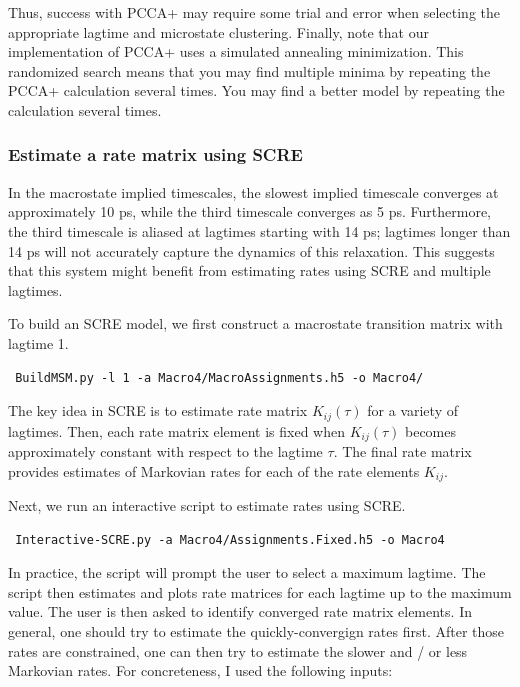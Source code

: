 \documentclass[12pt]{article}
\begin{document}
Thus, success with PCCA+ may require some trial and error when selecting the appropriate lagtime and microstate clustering.  Finally, note that our implementation of PCCA+ uses a simulated annealing minimization.  This randomized search means that you may find multiple minima by repeating the PCCA+ calculation several times.  You may find a better model by repeating the calculation several times.  

\subsubsection{Estimate a rate matrix using SCRE}

In the macrostate implied timescales, the slowest implied timescale converges at approximately 10 ps, while the third timescale converges as 5 ps.  Furthermore, the third timescale is aliased at lagtimes starting with 14 ps; lagtimes longer than 14 ps will not accurately capture the dynamics of this relaxation.  This suggests that this system might benefit from estimating rates using SCRE and multiple lagtimes.  

To build an SCRE model, we first construct a macrostate transition matrix with lagtime 1.  

\begin{verbatim}
 BuildMSM.py -l 1 -a Macro4/MacroAssignments.h5 -o Macro4/
\end{verbatim}

The key idea in SCRE is to estimate rate matrix $K_{ij}(\tau)$ for a variety of lagtimes.  Then, each rate matrix element is fixed when $K_{ij}(\tau)$ becomes approximately constant with respect to the lagtime $\tau$.  The final rate matrix provides estimates of Markovian rates for each of the rate elements $K_{ij}$.  

Next, we run an interactive script to estimate rates using SCRE.  

\begin{verbatim}
 Interactive-SCRE.py -a Macro4/Assignments.Fixed.h5 -o Macro4
\end{verbatim}

In practice, the script will prompt the user to select a maximum lagtime.  The script then estimates and plots rate matrices for each lagtime up to the maximum value.  The user is then asked to identify converged rate matrix elements.  In general, one should try to estimate the quickly-convergign rates first.  After those rates are constrained, one can then try to estimate the slower and / or less Markovian rates.  For concreteness, I used the following inputs:
\end{document}

